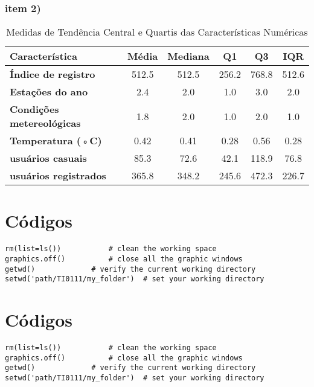 \documentclass[a4paper,11pt]{article}
\begin{document}
\subsubsection{item 2)}

\begin{table}[h]
\centering
\caption{Medidas de Tendência Central e Quartis das Características Numéricas}
\label{tab:estatisticas_descritivas}
\begin{tabular}{|l|c|c|c|c|c|}
\hline
\textbf{Característica} & \textbf{Média} & \textbf{Mediana} & \textbf{Q1} & \textbf{Q3} & \textbf{IQR} \\
\hline
\hline
\textbf{Índice de registro} & 512.5 & 512.5 & 256.2 & 768.8 & 512.6 \\
\hline
\textbf{Estações do ano} & 2.4 & 2.0 & 1.0 & 3.0 & 2.0 \\
\hline
\textbf{Condições metereológicas} & 1.8 & 2.0 & 1.0 & 2.0 & 1.0 \\
\hline
\textbf{Temperatura (◦C)} & 0.42 & 0.41 & 0.28 & 0.56 & 0.28 \\
\hline
\textbf{usuários casuais} & 85.3 & 72.6 & 42.1 & 118.9 & 76.8 \\
\hline
\textbf{usuários registrados} & 365.8 & 348.2 & 245.6 & 472.3 & 226.7 \\
\hline
\end{tabular}
\end{table}


\newpage
\begin{appendices}
\section{Códigos}\label{app:ex1}

\begin{lstlisting}[caption = {Solution of exercise \ref{sec:q1}}, label={freq.code.appendix}]
rm(list=ls()) 			# clean the working space
graphics.off()			# close all the graphic windows
getwd() 			# verify the current working directory
setwd('path/TI0111/my_folder')  # set your working directory
\end{lstlisting}

\section{Códigos}\label{app:ex2}
\begin{lstlisting}[caption = {Solution of exercise \ref{sec:q2}}, label={freq.code.appendix2}]
rm(list=ls()) 			# clean the working space
graphics.off()			# close all the graphic windows
getwd() 			# verify the current working directory
setwd('path/TI0111/my_folder')  # set your working directory
\end{lstlisting}
\end{appendices}
\end{document}

